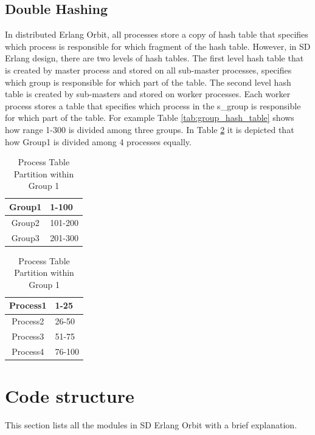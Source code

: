 \documentclass[11pt,a4paper]{article}
\begin{document}
\subsection*{Double Hashing} In distributed Erlang Orbit, all processes store a copy of hash table that specifies which process is responsible for which fragment of the hash table. However, in SD Erlang design, there are two levels of hash tables. The first level hash table that is created by master process and stored on all sub-master processes, specifies which group is responsible for which part of the table. The second level hash table is created by sub-masters and stored on worker processes. Each worker process stores a table that specifies which process in the s\_group is responsible for which part of the table. For example Table \ref{tab:group_hash_table} shows how range 1-300 is divided among three groups. In Table \ref{tab:processes_hash_table} it is depicted that how Group1 is divided among 4 processes equally.

\begin{table}
\parbox{.45\linewidth}{
\centering

\begin{tabular}{ | c | l | }
	\hline
	Group1 & 1-100 \\ \hline
	Group2 & 101-200 \\ \hline
	Group3 & 201-300 \\ \hline
	\end{tabular}

	\caption{Group Hash Partition}
	\label{tab:group_hash_table}
}
\hfill
\parbox{.60\linewidth}{
\centering

\begin{tabular}{ | c | l | }
	\hline
	Process1 & 1-25 \\ \hline
	Process2 & 26-50 \\ \hline
	Process3 & 51-75 \\ \hline
	Process4 & 76-100 \\ \hline
	\end{tabular}

	\caption{Process Table Partition within Group 1}
	\label{tab:processes_hash_table}
}
\end{table}

\section{Code structure}

This section lists all the modules in SD Erlang Orbit with a brief explanation.
\end{document}
